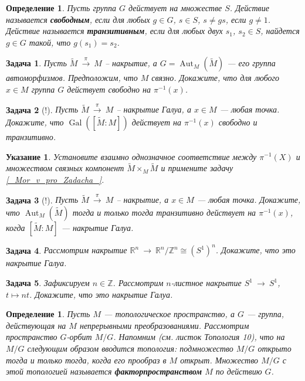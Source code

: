 \documentclass[12pt]{book}
\newcommand{\arrow}{{\:\longrightarrow\:}}
\def\Aut{\operatorname{Aut}}
\newcommand{\Gal}{\operatorname{Gal}}
\def\Z{{\mathbb Z}}
\def\R{{\mathbb R}}
\theoremstyle{upshape}
\newtheorem{zadacha}{Задача}[chapter]
\theoremstyle{generic}
\newtheorem{opredelenie}[teorema]{Определение}
\theoremstyle{upshapenonumber}
\newtheorem{ukazanie}{Указание}[section]
\newcommand{\следствие}{%
     \refstepcounter{teorema}
     {\noindent\bf Следствие \thechapter.\arabic{teorema}:\ }}
\newcommand{\пример}{%
     \refstepcounter{teorema}
     {\noindent\bf Пример \thechapter.\arabic{teorema}:\ }}
\newcommand{\лемма}{%
     \refstepcounter{teorema}
     {\noindent\bf Лемма \thechapter.\arabic{teorema}:\ }}
\newcommand{\теорема}{%
     \refstepcounter{teorema}
     {\noindent\bf Теорема \thechapter.\arabic{teorema}:\ }}
\newcommand{\утверждение}{%
     \refstepcounter{teorema}
     {\noindent\bf Утверждение \thechapter.\arabic{teorema}:\ }}
\begin{document}
{\begin{opredelenie} Пусть группа $G$ действует 
на множестве $S$. Действие называется {\bf свободным},
если для любых $g\in G$,  $s\in S$, $s\neq gs$, если 
$g\neq 1$. Действие называется {\bf транзитивным},
если для любых двух $s_1$, $s_2\in S$, найдется $g\in G$
такой, что $g(s_1)=s_2$. 
\end{opredelenie}

\begin{zadacha}
Пусть $\tilde M \stackrel\pi\arrow M$ --
накрытие, а $G=\Aut_M(\tilde M)$ --- его
группа автоморфизмов. Предположим, что $M$ связно.
Докажите, что для любого $x\in M$ группа $G$ действует свободно
на $\pi^{-1}(x)$.
\end{zadacha}

\begin{zadacha}[!]
Пусть $\tilde M \stackrel\pi\arrow M$ --
накрытие Галуа, а $x\in M$ --- любая точка.
Докажите, что $\Gal([\tilde M:M])$
действует на $\pi^{-1}(x)$ свободно и транзитивно.
\end{zadacha}

\begin{ukazanie}
Установите взаимно однозначное 
соответствие между $\pi^{-1}(X)$
и множеством связных компонент
$\tilde M\times_M\tilde M$ и примените
задачу \ref{_Mor_v_pro_Zadacha_}.
\end{ukazanie}

\begin{zadacha}[!]\label{_transi_na_sloe_Zadacha_}
Пусть $\tilde M \stackrel\pi\arrow M$ --
накрытие, а $x\in M$ --- любая точка. 
Докажите, что $\Aut_M(\tilde M)$
тогда и только тогда транзитивно действует на $\pi^{-1}(x)$,
когда $[\tilde M: M]$ --- накрытие Галуа.
\end{zadacha}

\begin{zadacha} 
Рассмотрим накрытие
$\R^n \arrow \R^n/\Z^n \cong (S^1)^n$.
Докажите, что это накрытие Галуа.
\end{zadacha}

\begin{zadacha} 
Зафиксируем $n\in \Z$.
Рассмотрим $n$-листное накрытие
$S^1 \arrow S^1$, $t \mapsto nt$.
Докажите, что это накрытие Галуа.
\end{zadacha}

\begin{opredelenie} Пусть $M$ --- топологическое пространство, а
$G$ --- группа, действующая на $M$ непрерывными преобразованиями. 
Рассмотрим пространство $G$-орбит
$M/G$. Напомним (см. листок Топология 10), что на $M/G$ 
следующим образом вводится топология:
подмножество $M/G$ открыто тогда и только тогда, когда
его прообраз в $M$ открыт. Множество $M/G$ с этой топологией
называется {\bf факторпространством} $M$ по действию $G$.
\end{opredelenie}

}
\end{document}
